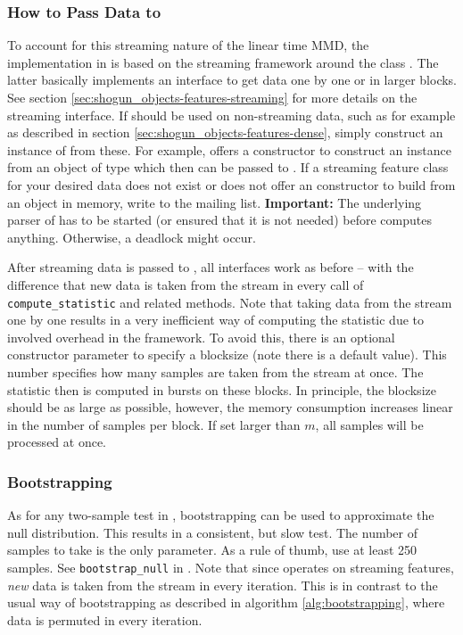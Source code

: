 \subsubsection*{How to Pass Data to }
To account for this streaming nature of the linear time MMD, the implementation in \shogun{} is based on the streaming framework around the class . The latter basically implements an interface to get data one by one or in larger blocks. See section \ref{sec:shogun_objects-features-streaming} for more details on the streaming interface. If  should be used on non-streaming data, such as for example  as described in section \ref{sec:shogun_objects-features-dense}, simply construct an instance of  from these. For example,  offers a constructor to construct an instance from an object of type  which then can be passed to  . If a streaming feature class for your desired data does not exist or does not offer an constructor to build from an object in memory, write to the mailing list.
\textbf{Important:} The underlying parser of  has to be started (or ensured that it is not needed) before  computes anything. Otherwise, a deadlock might occur.

After streaming data is passed to , all interfaces work as before -- with the difference that new data is taken from the stream in every call of \texttt{compute\_statistic} and related methods. Note that taking data from the stream one by one results in a very inefficient way of computing the statistic due to involved overhead in the framework. To avoid this, there is an optional constructor parameter to specify a blocksize (note there is a default value). This number specifies how many samples are taken from the stream at once. The statistic then is computed in bursts on these blocks. In principle, the blocksize should be as large as possible, however, the memory consumption increases linear in the number of samples per block.
If set larger than $m$, all samples will be processed at once.

\subsubsection{Bootstrapping}
As for any two-sample test in \shogun{}, bootstrapping can be used to approximate the null distribution. This results in a consistent, but slow test. The number of samples to take is the only parameter. As a rule of thumb, use at least 250 samples.
See \texttt{bootstrap\_null} in .
Note that since  operates on streaming features, \emph{new} data is taken from the stream in every iteration. This is in contrast to the usual way of bootstrapping as described in algorithm \ref{alg:bootstrapping}, where data is permuted in every iteration.

